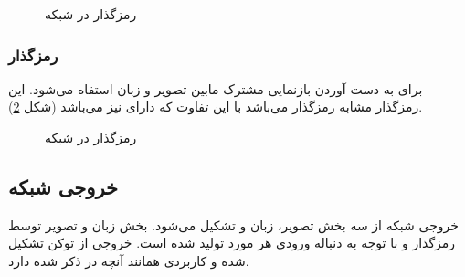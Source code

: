 \begin{figure}[H]
	\caption{رمزگذار 
		در شبکه
		 \cite{tan2019lxmert}}
	\label{lxmert-single-encoder}
\end{figure}
\newpage
\subsubsection{رمزگذار
	}
برای به دست آوردن بازنمایی مشترک مابین تصویر و زبان استفاه می‌شود. این رمزگذار مشابه رمزگذار 
می‌باشد با این تفاوت که دارای
نیز می‌باشد (شکل \ref{lxmert-cross-encoder}).

\begin{figure}[H]
	\caption{رمزگذار 
		در شبکه
		 \cite{tan2019lxmert}}
	\label{lxmert-cross-encoder}
\end{figure}
\subsection{خروجی شبکه}
خروجی شبکه
از سه بخش تصویر، زبان و 
تشکیل می‌شود. بخش زبان و تصویر توسط رمزگذار
و با توجه به دنباله ورودی هر مورد تولید شده است. خروجی 
از توکن 
تشکیل شده و کاربردی همانند آنچه در 
ذکر شده دارد.
